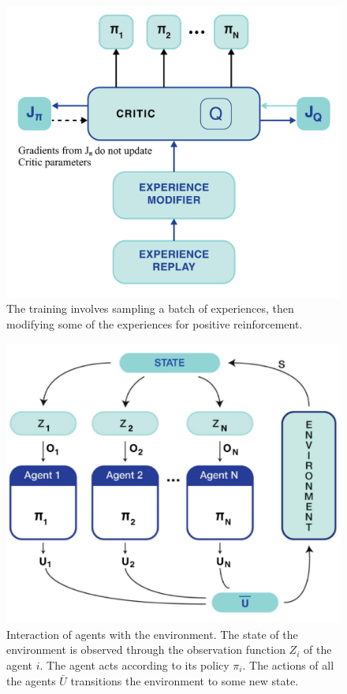 \begin{figure}
	\centering
	\includegraphics[width=5in]{mobilerobotrlcritic.png}
	\caption{The training involves sampling a batch of experiences, then modifying some of the experiences for positive reinforcement.}
	\label{fig:mobilerobotrlcritic} 
\end{figure}

\begin{figure}
	\centering
	\includegraphics[width=5in]{multirobotfcframework.png}
	\caption{Interaction of agents with the environment. The state of the environment is observed through the observation function $Z_{i}$ of the agent $ i $. The agent acts according to its policy $ \pi_{i} $. The actions of all the agents $ \bar{U} $ transitions the environment to some new state.}
	\label{fig:multirobotfcframework} 
\end{figure}

